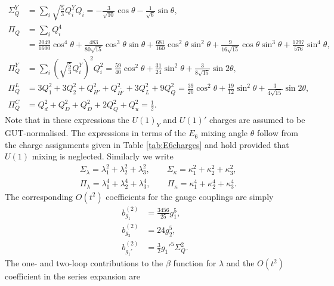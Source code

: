 \documentclass[preprint,amsmath,amssymb,aps,superscriptaddress,prd,
showpacs,floatfix,nofootinbib]{revtex4-1}
\begin{document}
\begin{align*}
\Sigma_{Q}^Y &= \sum_i \sqrt{\frac{5}{3}} Q_i^Y Q_i =
-\frac{3}{\sqrt{10}} \cos\theta - \frac{1}{\sqrt{6}} \sin\theta , \\
\Pi_{Q} &= \sum_i Q_i^4 \\
&= \frac{2049}{1600} \cos^4\theta +
\frac{483}{80\sqrt{15}} \cos^3\theta \sin\theta +
\frac{681}{160} \cos^2\theta \sin^2\theta +
\frac{9}{16\sqrt{15}} \cos\theta \sin^3\theta +
\frac{1297}{576}\sin^4\theta , \\
\Pi_{Q}^Y &= \sum_i \left ( \sqrt{\frac{5}{3}} Q_i^Y \right )^2 Q_i^2 =
\frac{59}{40} \cos^2\theta + \frac{31}{24} \sin^2\theta +
\frac{3}{8\sqrt{15}} \sin 2\theta , \\
\Pi_{Q}^L &= 3 Q_1^2 + 3Q_2^2 + Q_{H'}^2 + Q_{\overline{H'}}^2 + 3 Q_L^2 +
9 Q_Q^2 = \frac{39}{20} \cos^2\theta + \frac{19}{12} \sin^2\theta +
\frac{3}{4\sqrt{15}} \sin 2\theta , \\
\Pi_{Q}^C &= Q_d^2 + Q_D^2 + Q_{\overline{D}}^2 + 2 Q_Q^2 + Q_u^2 =
\frac{1}{2} .
\end{align*}
Note that in these expressions the $U(1)_Y$ and $U(1)'$ charges are assumed to
be GUT-normalised.  The expressions in terms of the $E_6$ mixing angle
$\theta$ follow from the charge assignments given in Table \ref{tab:E6charges}
and hold provided that $U(1)$ mixing is neglected.  Similarly we write
\begin{align*}
&\Sigma_\lambda = \lambda_1^2 + \lambda_2^2 + \lambda_3^2 ,
\qquad \Sigma_\kappa = \kappa_1^2 + \kappa_2^2 + \kappa_3^2 , \\
&\Pi_\lambda = \lambda_1^4 + \lambda_2^4 + \lambda_3^4 ,
\qquad \Pi_\kappa = \kappa_1^4 + \kappa_2^4 + \kappa_3^4 .
\end{align*}
The corresponding $O(t^2)$ coefficients for the gauge couplings are simply
\begin{subequations} \label{eq:USSMGaugeOt2Coeffs}
\begin{align}
b_{g_1}^{(2)} &= \frac{3456}{25} g_1^5 , \label{eq:USSMg1Ot2Coeff} \\
b_{g_2}^{(2)} &= 24 g_2^5 , \label{eq:USSMg2Ot2Coeff} \\
b_{g_1'}^{(2)} &= \frac{3}{2} g_1'^5 \Sigma_{Q}^2 . \label{eq:USSMg1pOt2Coeff}
\end{align}
\end{subequations}
The one- and two-loop contributions to the $\beta$ function for $\lambda$
and the $O(t^2)$ coefficient in the series expansion are
\end{document}
